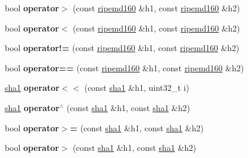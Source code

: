 \begin{DoxyCompactItemize}
\mbox{\label{namespacefc_a9da91214e83a3e77d9c5de959918d1da}} 
bool {\bfseries operator$>$} (const \mbox{\hyperlink{classfc_1_1ripemd160}{ripemd160}} \&h1, const \mbox{\hyperlink{classfc_1_1ripemd160}{ripemd160}} \&h2)
\item 
\mbox{\label{namespacefc_abfcd487e59126b37465a6d02ec614b50}} 
bool {\bfseries operator$<$} (const \mbox{\hyperlink{classfc_1_1ripemd160}{ripemd160}} \&h1, const \mbox{\hyperlink{classfc_1_1ripemd160}{ripemd160}} \&h2)
\item 
\mbox{\label{namespacefc_ad99d30ff93d0c2baa248be0dd99ec08d}} 
bool {\bfseries operator!=} (const \mbox{\hyperlink{classfc_1_1ripemd160}{ripemd160}} \&h1, const \mbox{\hyperlink{classfc_1_1ripemd160}{ripemd160}} \&h2)
\item 
\mbox{\label{namespacefc_ac1884b8b64cd69fbc927de7270fc5058}} 
bool {\bfseries operator==} (const \mbox{\hyperlink{classfc_1_1ripemd160}{ripemd160}} \&h1, const \mbox{\hyperlink{classfc_1_1ripemd160}{ripemd160}} \&h2)
\item 
\mbox{\label{namespacefc_a9a69da97dd19b58a4c838a5266521ae0}} 
\mbox{\hyperlink{classfc_1_1sha1}{sha1}} {\bfseries operator$<$$<$} (const \mbox{\hyperlink{classfc_1_1sha1}{sha1}} \&h1, uint32\+\_\+t i)
\item 
\mbox{\label{namespacefc_a85ec8d03a744d4e1b7b62abc92e0f503}} 
\mbox{\hyperlink{classfc_1_1sha1}{sha1}} {\bfseries operator$^\wedge$} (const \mbox{\hyperlink{classfc_1_1sha1}{sha1}} \&h1, const \mbox{\hyperlink{classfc_1_1sha1}{sha1}} \&h2)
\item 
\mbox{\label{namespacefc_a647ef584f66cbb8d32380214f6db38ae}} 
bool {\bfseries operator$>$=} (const \mbox{\hyperlink{classfc_1_1sha1}{sha1}} \&h1, const \mbox{\hyperlink{classfc_1_1sha1}{sha1}} \&h2)
\item 
\mbox{\label{namespacefc_a7f41676b2521157847fe830f24a17dc4}} 
bool {\bfseries operator$>$} (const \mbox{\hyperlink{classfc_1_1sha1}{sha1}} \&h1, const \mbox{\hyperlink{classfc_1_1sha1}{sha1}} \&h2)
\item 
\mbox{\label{namespacefc_a2aacf2eaaf7fd3f5faa5b165ae73938e}} 

\end{DoxyCompactItemize}
